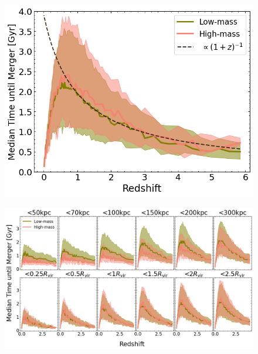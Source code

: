 \documentclass[twocolumn]{aastex631}
\begin{document}
\begin{figure}[htb]
    \centering
    \includegraphics[width=\textwidth]{plots/bet-on-it/3_time_til_merger_full_fit.png}
    \caption{}
\end{figure}

\begin{figure}[htb]
    \centering
    \includegraphics[width=\textwidth]{plots/bet-on-it/3_time_til_merger.png}
    \caption{}
\end{figure}
\end{document}
